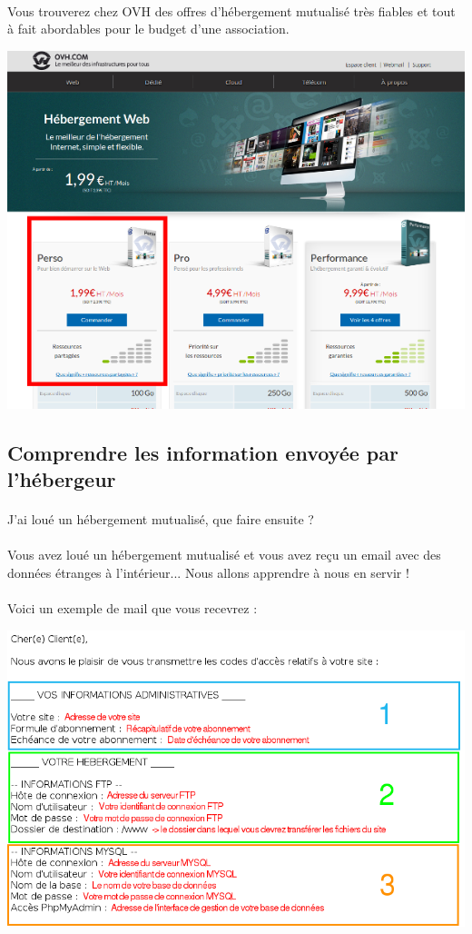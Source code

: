 \documentclass[10pt,a4paper]{article}
\begin{document}
\paragraph{}Vous trouverez chez OVH des offres d'hébergement mutualisé très fiables et tout à fait abordables pour le budget d'une association.
\begin{center}
\includegraphics[scale=0.5]{img/0008.png}
\end{center}
\subsection{Comprendre les information envoyée par l'hébergeur}
\paragraph{}J'ai loué un hébergement mutualisé, que faire ensuite ?
\paragraph{}Vous avez loué un hébergement mutualisé et vous avez reçu un email avec des données étranges à l'intérieur... Nous allons apprendre à nous en servir !
\paragraph{}Voici un exemple de mail que vous recevrez :
\begin{center}
\includegraphics[scale=0.4]{img/0009.png}
\end{center}
\end{document}
